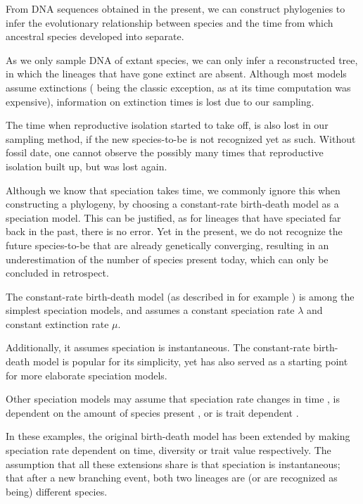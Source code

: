 \documentclass{article}
\begin{document}
From DNA sequences obtained in the present, we can construct phylogenies
to infer the evolutionary relationship between species and the time 
from which ancestral species developed into separate.
  
As we only sample DNA of extant species, 
we can only infer a reconstructed tree, in which
the lineages that have gone extinct are absent.
Although most models assume extinctions (\cite{yule1925mathematical} being the
classic exception, as at its time computation was expensive), 
information on extinction times is lost due to our sampling.


The time when reproductive isolation started to take off, is
also lost in our sampling method, if the new species-to-be is not 
recognized yet as such. Without fossil date, one cannot observe the
possibly many times that reproductive isolation built up, but was lost again.


Although we know that speciation takes time, we commonly ignore this when
constructing a phylogeny, by choosing a constant-rate birth-death model
as a speciation model. This can be justified, as for lineages 
that have speciated far back in the past, there is no error. 
Yet in the present, we do not recognize the future species-to-be
that are already genetically converging, resulting in an underestimation
of the number of species present today, which can only be 
concluded in retrospect.

The constant-rate birth-death model (as described in for example \cite{nee1994reconstructed}) 
is among the simplest speciation models, and assumes a constant speciation
 rate $\lambda$ and constant extinction rate $\mu$.

Additionally, it assumes speciation is instantaneous.
The constant-rate birth-death model is popular for its simplicity, yet
has also served as a starting point for more elaborate speciation models.


Other speciation models may assume that speciation rate changes in 
time \cite{rabosky2008explosive}, is dependent on the amount of species 
present \cite{etienne2011diversity}, or is trait 
dependent \cite{fitzjohn2009estimating}.

In these examples, the original birth-death model has been extended by making 
speciation rate dependent on time, diversity or trait value respectively.
The assumption that all these extensions share is that speciation is instantaneous;
that after a new branching event, both two lineages are (or are recognized as being) different
species.
\end{document}
